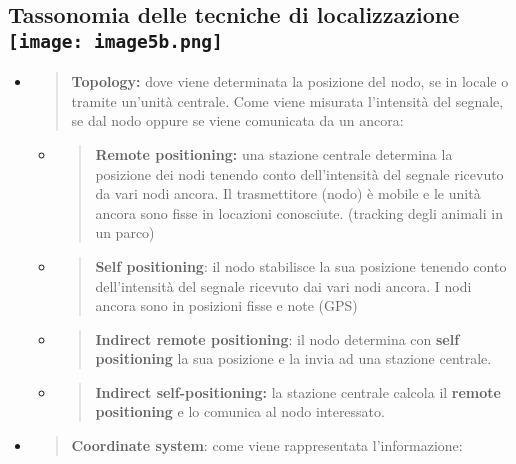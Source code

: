 \subsection[Tassonomia delle tecniche di
localizzazione]{\texorpdfstring{Tassonomia delle tecniche di
localizzazione
\protect\texttt{[image: image5b.png]}}
{Tassonomia delle tecniche di localizzazione}}
\label{tassonomia-delle-tecniche-di-localizzazione}

\begin{itemize}
\item
  \begin{quote}
  \textbf{Topology:} dove viene determinata la posizione del nodo, se in
  locale o tramite un'unità centrale. Come viene misurata l'intensità
  del segnale, se dal nodo oppure se viene comunicata da un ancora:
  \end{quote}

  \begin{itemize}
  \item
    \begin{quote}
    \textbf{Remote positioning:} una stazione centrale determina la
    posizione dei nodi tenendo conto dell'intensità del segnale ricevuto
    da vari nodi ancora. Il trasmettitore (nodo) è mobile e le unità
    ancora sono fisse in locazioni conosciute. (tracking degli animali
    in un parco)
    \end{quote}
  \item
    \begin{quote}
    \textbf{Self positioning}: il nodo stabilisce la sua posizione
    tenendo conto dell'intensità del segnale ricevuto dai vari nodi
    ancora. I nodi ancora sono in posizioni fisse e note (GPS)
    \end{quote}
  \item
    \begin{quote}
    \textbf{Indirect remote positioning}: il nodo determina con
    \textbf{self positioning} la sua posizione e la invia ad una
    stazione centrale.
    \end{quote}
  \item
    \begin{quote}
    \textbf{Indirect self-positioning:} la stazione centrale calcola il
    \textbf{remote positioning} e lo comunica al nodo interessato.
    \end{quote}
  \end{itemize}
\item
  \begin{quote}
  \textbf{Coordinate system}: come viene rappresentata l'informazione:
  \end{quote}


\end{itemize}
